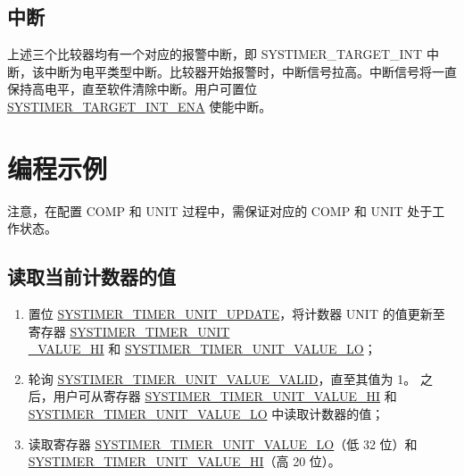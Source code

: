 \documentclass[main\_\_CN.tex]{subfiles}
\begin{document}
\subsection{中断}
上述三个比较器均有一个对应的报警中断，即 SYSTIMER\_TARGET\_INT 中断，该中断为电平类型中断。比较器开始报警时，中断信号拉高。中断信号将一直保持高电平，直至软件清除中断。用户可置位 \hyperref[fielddesc:SYSTIMERTARGET0INTENA]{SYSTIMER\_TARGET\_INT\_ENA} 使能中断。


\section{编程示例}\label{sec:instructions-of-usage}
注意，在配置 COMP 和 UNIT 过程中，需保证对应的 COMP 和 UNIT 处于工作状态。

\subsection{读取当前计数器的值}\label{sec:to-read-system-timer-value}
\begin{enumerate}
    \item 置位 \hyperref[fielddesc:SYSTIMERTIMERUNIT0UPDATE]{SYSTIMER\_TIMER\_UNIT\_UPDATE}，将计数器 UNIT 的值更新至寄存器 \hyperref[fielddesc:SYSTIMERTIMERUNIT0VALUEHI]{SYSTIMER\_TIMER\_UNIT\\\_VALUE\_HI} 和 \hyperref[fielddesc:SYSTIMERTIMERUNIT0VALUELO]{SYSTIMER\_TIMER\_UNIT\_VALUE\_LO}；
    \item 轮询 \hyperref[fielddesc:SYSTIMERTIMERUNIT0VALUEVALID]{SYSTIMER\_TIMER\_UNIT\_VALUE\_VALID}，直至其值为 1。
    之后，用户可从寄存器 \hyperref[fielddesc:SYSTIMERTIMERUNIT0VALUEHI]{SYSTIMER\_TIMER\_UNIT\_VALUE\_HI} 和 \hyperref[fielddesc:SYSTIMERTIMERUNIT0VALUELO]{SYSTIMER\_TIMER\_UNIT\_VALUE\_LO} 中读取计数器的值；
    \item 读取寄存器 \hyperref[fielddesc:SYSTIMERTIMERUNIT0VALUELO]{SYSTIMER\_TIMER\_UNIT\_VALUE\_LO}（低 32 位）和 \hyperref[fielddesc:SYSTIMERTIMERUNIT0VALUEHI]{SYSTIMER\_TIMER\_UNIT\_VALUE\_HI}（高 20 位）。
\end{enumerate}
\end{document}

